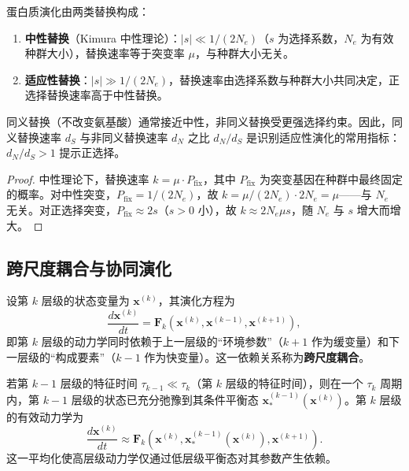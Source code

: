 \begin{proposition}[中性替换与选择替换]\label{prop:neutral_selection}
蛋白质演化由两类替换构成：
\begin{enumerate}[label=(\roman*)]
    \item \textbf{中性替换}（Kimura 中性理论）：$|s| \ll 1/(2N_e)$（$s$ 为选择系数，$N_e$ 为有效种群大小），替换速率等于突变率 $\mu$，与种群大小无关。
    \item \textbf{适应性替换}：$|s| \gg 1/(2N_e)$，替换速率由选择系数与种群大小共同决定，正选择替换速率高于中性替换。
\end{enumerate}
同义替换（不改变氨基酸）通常接近中性，非同义替换受更强选择约束。因此，同义替换速率 $d_S$ 与非同义替换速率 $d_N$ 之比 $d_N/d_S$ 是识别适应性演化的常用指标：$d_N/d_S > 1$ 提示正选择。
\end{proposition}

\begin{proof}
中性理论下，替换速率 $k = \mu \cdot P_{\text{fix}}$，其中 $P_{\text{fix}}$ 为突变基因在种群中最终固定的概率。对中性突变，$P_{\text{fix}} = 1/(2N_e)$，故 $k = \mu/(2N_e) \cdot 2N_e = \mu$——与 $N_e$ 无关。对正选择突变，$P_{\text{fix}} \approx 2s$（$s > 0$ 小），故 $k \approx 2N_e \mu s$，随 $N_e$ 与 $s$ 增大而增大。
\end{proof}

\subsection{跨尺度耦合与协同演化}

\begin{definition}[跨尺度耦合]\label{def:cross_scale_coupling}
设第 $k$ 层级的状态变量为 $\mathbf{x}^{(k)}$，其演化方程为
\[
\frac{d\mathbf{x}^{(k)}}{dt} = \mathbf{F}_k(\mathbf{x}^{(k)}, \mathbf{x}^{(k-1)}, \mathbf{x}^{(k+1)}),
\]
即第 $k$ 层级的动力学同时依赖于上一层级的“环境参数”（$k+1$ 作为缓变量）和下一层级的“构成要素”（$k-1$ 作为快变量）。这一依赖关系称为\textbf{跨尺度耦合}。
\end{definition}

\begin{proposition}[时间尺度分离下的平均化]\label{prop:adiabatic_averaging}
若第 $k-1$ 层级的特征时间 $\tau_{k-1} \ll \tau_k$（第 $k$ 层级的特征时间），则在一个 $\tau_k$ 周期内，第 $k-1$ 层级的状态已充分弛豫到其条件平衡态 $\mathbf{x}^{(k-1)}_*(\mathbf{x}^{(k)})$。第 $k$ 层级的有效动力学为
\[
\frac{d\mathbf{x}^{(k)}}{dt} \approx \mathbf{F}_k(\mathbf{x}^{(k)}, \mathbf{x}^{(k-1)}_*(\mathbf{x}^{(k)}), \mathbf{x}^{(k+1)}).
\]
这一平均化使高层级动力学仅通过低层级平衡态对其参数产生依赖。
\end{proposition}

